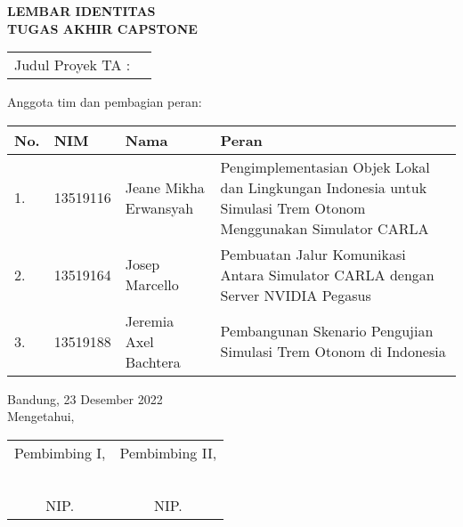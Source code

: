 \clearpage
\pagestyle{empty}

\begin{center}
	\smallskip

	\Large \bfseries \MakeUppercase{
		Lembar Identitas \\
		Tugas Akhir Capstone
	}
	\vspace{0.5cm}

	\raggedright
	\begin{table}[h!]
		\large \bfseries
		\begin{tabular}{p{} p{}}
			Judul Proyek TA : & \capstoneTitle
		\end{tabular}
	\end{table}

	\normalsize \normalfont

	Anggota tim dan pembagian peran:

	\begin{table}[h!]
		\begin{tabular}{|p{} | p{} | p{} | p{}|}
			\hline
			\textbf{No.} & \textbf{NIM} & \textbf{Nama}         & \textbf{Peran}                                                                                                 \\
			\hline
			1.           & 13519116     & Jeane Mikha Erwansyah & Pengimplementasian Objek Lokal dan Lingkungan Indonesia untuk Simulasi Trem Otonom Menggunakan Simulator CARLA \\
			\hline
			2.           & 13519164     & Josep Marcello        & Pembuatan Jalur Komunikasi Antara Simulator CARLA dengan Server NVIDIA Pegasus                                 \\
			\hline
			3.           & 13519188     & Jeremia Axel Bachtera & Pembangunan Skenario Pengujian Simulasi Trem Otonom di Indonesia                                               \\
			\hline
		\end{tabular}
	\end{table}

	\normalsize \normalfont \centering
	Bandung, 23 Desember 2022 \\
	Mengetahui,

	\vspace{0.5cm}
	\setlength{\tabcolsep}{12pt}
	\begin{tabular}{c@{\hskip 0.5in}c}
		Pembimbing I,               & Pembimbing II,             \\
		                            &                            \\
		                            &                            \\
		                            &                            \\
		                            &                            \\
		\underline{\pembimbingSatu} & \underline{\pembimbingDua} \\
		NIP. \pembimbingSatuNip     & NIP. \pembimbingDuaNip     \\
	\end{tabular}

\end{center}
\clearpage
